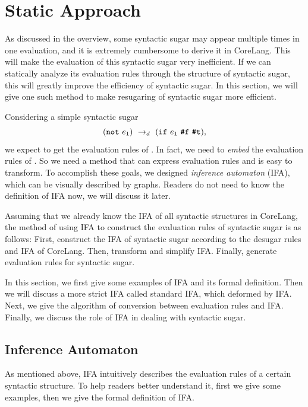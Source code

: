 \section{Static Approach}
\label{sec:ruleDerivation}

As discussed in the overview, some syntactic sugar may appear multiple times in one evaluation, and it is extremely cumbersome to derive it in CoreLang. This will make the evaluation of this syntactic sugar very inefficient. If we can statically analyze its evaluation rules through the structure of syntactic sugar, this will greatly improve the efficiency of syntactic sugar. In this section, we will give one such method to make resugaring of syntactic sugar more efficient.

Considering a simple syntactic sugar
\[(\mbox{\tt not}~e_1) ~\rightarrow_d~ (\mbox{\tt if}~e_1~\mbox{\tt \#f}~\mbox{\tt \#t}),\]
we expect to get the evaluation rules of . In fact, we need to \textit{embed} the evaluation rules of . So we need a method that can express evaluation rules and is easy to transform. To accomplish these goals, we designed \textit{inference automaton} (IFA), which can be visually described by graphs. Readers do not need to know the definition of IFA now, we will discuss it later.

Assuming that we already know the IFA of all syntactic structures in CoreLang, the method of using IFA to construct the evaluation rules of syntactic sugar is as follows: First, construct the IFA of syntactic sugar according to the desugar rules and IFA of CoreLang. Then, transform and simplify IFA. Finally, generate evaluation rules for syntactic sugar.

In this section, we first give some examples of IFA and its formal definition. Then we will discuss a more strict IFA called standard IFA, which deformed by IFA. Next, we give the algorithm of conversion between evaluation rules and IFA. Finally, we discuss the role of IFA in dealing with syntactic sugar.

\subsection{Inference Automaton}

As mentioned above, IFA intuitively describes the evaluation rules of a certain syntactic structure. To help readers better understand it, first we give some examples, then we give the formal definition of IFA.

